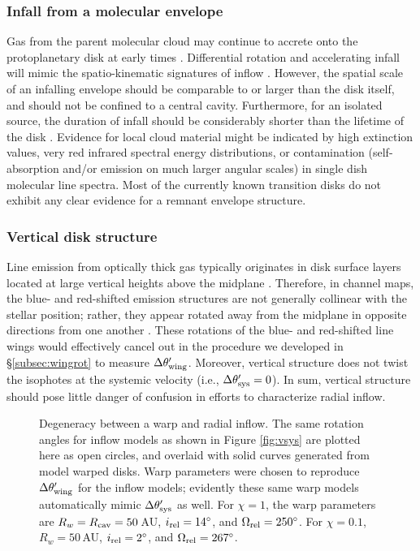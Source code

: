 \subsubsection{Infall from a molecular envelope}

Gas from the parent molecular cloud may continue to accrete onto the 
protoplanetary disk at early times \citep{stahler94,yorke99,brinch07}.  
Differential rotation and accelerating infall will mimic the spatio-kinematic 
signatures of inflow \citep[cf.][]{brinch08,tang12}.  However, the spatial 
scale of an infalling envelope should be comparable to or larger than the disk 
itself, and should not be confined to a central cavity.  Furthermore, for an 
isolated source, the duration of infall should be considerably shorter than the
lifetime of the disk \citep[e.g.,][]{pietu05}.  Evidence for local cloud 
material might be indicated by high extinction values, very red infrared 
spectral energy distributions, or contamination (self-absorption and/or 
emission on much larger angular scales) in single dish molecular line spectra.  
Most of the currently known transition disks do not exhibit any clear evidence 
for a remnant envelope structure.


\subsubsection{Vertical disk structure} \label{vert}

Line emission from optically thick gas typically originates in disk surface 
layers located at large vertical heights above the midplane
\citep[e.g.,][]{vanzadelhoff01,dartois03,pavlyuchenkov07,semenov08}.
Therefore, in channel maps, the blue- and red-shifted emission structures are 
not generally collinear with the stellar position; rather, they appear rotated 
away from the midplane in opposite directions from one another
\citep{rosenfeld13,degregorio-monsalvo13}.  These rotations of the blue- and 
red-shifted line wings would effectively cancel out in the procedure we 
developed in \S \ref{subsec:wingrot} to measure $\Delta \theta'_{\rm wing}$.
Moreover, vertical structure does not twist the isophotes at the systemic 
velocity (i.e., $\Delta \theta'_{\rm sys} = 0$).  In sum, vertical structure 
should pose little danger of confusion in efforts to characterize radial 
inflow.

\begin{figure}[t!]
\caption{Degeneracy between a warp and radial inflow.  The same rotation 
angles for inflow models as shown in Figure \ref{fig:vsys} are plotted here as 
open circles, and overlaid with solid curves generated from model warped 
disks.  Warp parameters were chosen to reproduce $\Delta \theta_{\rm wing}'$ 
for the inflow models; evidently these same warp models automatically mimic 
$\Delta \theta_{\rm sys}'$ as well.  For $\chi=1$, the warp parameters are $R_w 
= R_{\rm cav} = 50$\,AU, $i_{\rm rel}=14^\circ$, and $\Omega_{\rm rel} = 
250^\circ$.  For $\chi = 0.1$, $R_w = 50$\,AU, $i_{\rm rel} = 2^\circ$, and 
$\Omega_{\rm rel}=267^\circ$.  \label{fig:vsys_warp}}
\end{figure}


